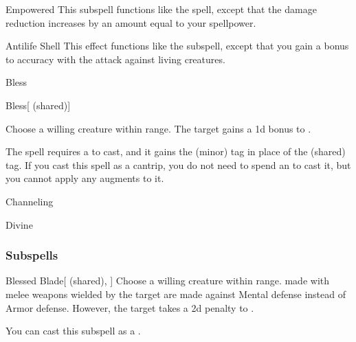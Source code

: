 \begin{ability}[\nth{5}]{Empowered}
This subspell functions like the  spell, except that the damage reduction increases by an amount equal to your spellpower.
\end{ability}
\vspace{0.25em}


\begin{ability}[\nth{7}]{Antilife Shell}
This effect functions like the  subspell, except that you gain a  bonus to accuracy with the attack against living creatures.
\end{ability}
\vspace{0.25em}

\newpage
\begin{spellsection}{Bless}

\begin{spellheader}
\end{spellheader}


\begin{ability}{Bless}[ (shared)]

Choose a willing creature within \rngclose range.
The target gains a \plus1d bonus to .

\end{ability}



 The spell requires a  to cast, and it gains the  (minor) tag in place of the  (shared) tag. If you cast this spell as a cantrip,
you do not need to spend an  to cast it,
but you cannot apply any augments to it.


 Channeling

 Divine
\end{spellsection}


\subsubsection{Subspells}


\begin{ability}[\nth{3}]{Blessed Blade}[ (shared), ]
Choose a willing creature within \rngclose range.
 made with melee weapons wielded by the target are made against Mental defense instead of Armor defense.
However, the target takes a \minus2d penalty to .

You can cast this subspell as a .
\end{ability}
\vspace{0.25em}


